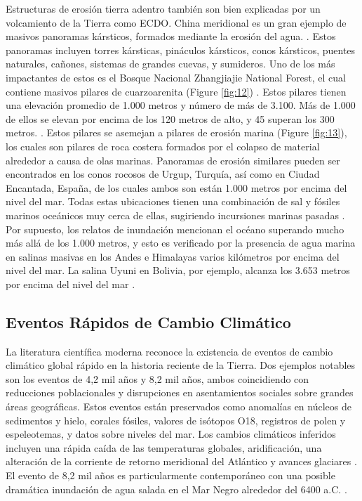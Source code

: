 \documentclass[10pt,twocolumn,letterpaper]{article}
\begin{document}
Estructuras de erosión tierra adentro también son bien explicadas por un volcamiento de la Tierra como ECDO. China meridional es un gran ejemplo de masivos panoramas kársticos, formados mediante la erosión del agua. \cite{82}. Estos panoramas incluyen torres kársticas, pináculos kársticos, conos kársticos, puentes naturales, cañones, sistemas de grandes cuevas, y sumideros. Uno de los más impactantes de estos es el Bosque Nacional Zhangjiajie National Forest, el cual contiene masivos pilares de cuarzoarenita (Figure \ref{fig:12}) \cite{84}. Estos pilares tienen una elevación promedio de 1.000 metros y número de más de 3.100. Más de 1.000 de ellos se elevan por encima de los 120 metros de alto, y 45 superan los 300 metros. \cite{85}. Estos pilares se asemejan a pilares de erosión marina (Figure \ref{fig:13}), los cuales son pilares de roca costera formados por el colapso de material alrededor a causa de olas marinas. Panoramas de erosión similares pueden ser encontrados en los conos rocosos de Urgup, Turquía, así como en  Ciudad Encantada, España, de los cuales ambos son están 1.000 metros por encima del nivel del mar. Todas estas ubicaciones tienen una combinación de sal y fósiles marinos oceánicos muy cerca de ellas, sugiriendo incursiones marinas pasadas \cite{15,86,87}. Por supuesto, los relatos de inundación \cite{3} mencionan el océano superando mucho más allá de los 1.000 metros, y esto es verificado por la presencia de agua marina en salinas masivas en los Andes e Himalayas varios kilómetros por encima del nivel del mar. La salina Uyuni en Bolivia, por ejemplo, alcanza los 3.653 metros por encima del nivel del mar \cite{94}.

\subsection{Eventos Rápidos de Cambio Climático}

La literatura científica moderna reconoce la existencia de eventos de cambio climático global rápido en la historia reciente de la Tierra. Dos ejemplos notables son los eventos de 4,2 mil años y 8,2 mil años, ambos coincidiendo con reducciones poblacionales y disrupciones en asentamientos sociales sobre grandes áreas geográficas. Estos eventos están preservados como anomalías en núcleos de sedimentos y hielo, corales fósiles, valores de isótopos O18, registros de polen y espeleotemas, y datos sobre niveles del mar. Los cambios climáticos inferidos incluyen una rápida caída de las temperaturas globales, aridificación, una alteración de la corriente de retorno meridional del Atlántico y avances glaciares \cite{90,91,92}. El evento de 8,2 mil años es particularmente contemporáneo con una posible dramática inundación de agua salada en el Mar Negro alrededor del 6400 a.C. \cite{93}.
\end{document}

